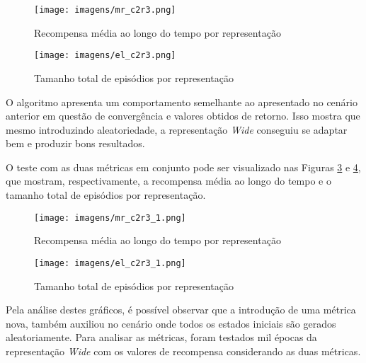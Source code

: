 \begin{figure}[htb]
	\caption{\label{mr_c2r3}Recompensa média ao longo do tempo por representação}
	\begin{center}
	    \texttt{[image: imagens/mr\_c2r3.png]}
	\end{center}
\end{figure}

\begin{figure}[htb]
	\caption{\label{el_c2r3}Tamanho total de episódios por representação}
	\begin{center}
	    \texttt{[image: imagens/el\_c2r3.png]}
	\end{center}
\end{figure}

\FloatBarrier

O algoritmo apresenta um comportamento semelhante ao apresentado no cenário anterior em questão de convergência e valores
obtidos de retorno. Isso mostra que mesmo introduzindo aleatoriedade, a representação \textit{Wide} conseguiu se adaptar
bem e produzir bons resultados.


O teste com as duas métricas em conjunto pode ser visualizado nas Figuras 
\ref{mr_c2r3_1} e \ref{el_c2r3_1}, que mostram, respectivamente, a 
recompensa média ao longo do tempo e o tamanho total de episódios por representação.
\begin{figure}[htb]
	\caption{\label{mr_c2r3_1}Recompensa média ao longo do tempo por representação}
	\begin{center}
	    \texttt{[image: imagens/mr\_c2r3\_1.png]}
	\end{center}
\end{figure}

\begin{figure}[htb]
	\caption{\label{el_c2r3_1}Tamanho total de episódios por representação}
	\begin{center}
	    \texttt{[image: imagens/el\_c2r3\_1.png]}
	\end{center}
\end{figure}

\FloatBarrier

Pela análise destes gráficos, é possível observar que a 
introdução de uma métrica nova, também auxiliou no cenário 
onde todos os estados iniciais são gerados aleatoriamente. Para analisar as métricas, foram testados mil épocas da
representação \textit{Wide} com os valores de recompensa considerando as duas métricas.

